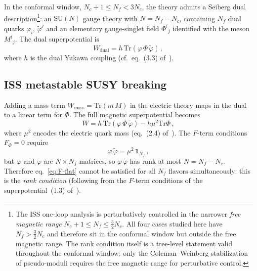 \documentclass[11pt,a4paper]{article}
\newcommand{\Nf}{N_{\!f}}
\newcommand{\Nc}{N_{\!c}}
\newcommand{\Tr}{\mathrm{Tr}}
\begin{document}
In the conformal window, $\Nc + 1 \le \Nf < 3\Nc$, the theory
admits a Seiberg dual description\footnote{The ISS one-loop
analysis is perturbatively controlled in the narrower
\emph{free magnetic range} $\Nc + 1 \le \Nf \le \frac{3}{2}\Nc$.
All four cases studied here have $\Nf > \frac{3}{2}\Nc$ and
therefore sit in the conformal window but outside the free
magnetic range.  The rank condition itself is a tree-level
statement valid throughout the conformal window; only the
Coleman--Weinberg stabilization of pseudo-moduli requires
the free magnetic range for perturbative control.}: an $\mathrm{SU}(N)$ gauge theory
with $N = \Nf - \Nc$, containing $\Nf$ dual quarks $\varphi_i$,
$\tilde\varphi^j$ and an elementary gauge-singlet field $\Phi^i{}_j$
identified with the meson $M^i{}_j$.
The dual superpotential is~\cite{Seiberg1995}
\begin{equation}
  W_{\text{dual}} = h\,\Tr(\varphi\,\Phi\,\tilde\varphi)\,,
  \label{eq:dual-W}
\end{equation}
where $h$ is the dual Yukawa coupling (cf.\ eq.~(3.3) of~\cite{Seiberg1995}).

\subsection{ISS metastable SUSY breaking}

Adding a mass term $W_{\text{mass}} = \Tr(m\, M)$ in the electric
theory maps in the dual to a linear term for $\Phi$.
The full magnetic superpotential becomes~\cite{ISS2006}
\begin{equation}
  W = h\,\Tr(\varphi\,\Phi\,\tilde\varphi)
    - h\mu^2 \Tr\Phi\,,
  \label{eq:ISS-W}
\end{equation}
where $\mu^2$ encodes the electric quark mass
(eq.~(2.4) of~\cite{ISS2006}).
The $F$-term conditions $F_\Phi = 0$ require
\begin{equation}
  \varphi\,\tilde\varphi = \mu^2\,\mathbf{1}_{\Nf}\,,
  \label{eq:F-flat}
\end{equation}
but $\varphi$ and $\tilde\varphi$ are $N\times\Nf$ matrices, so
$\varphi\,\tilde\varphi$ has rank at most $N = \Nf - \Nc$.
Therefore eq.~\eqref{eq:F-flat} cannot be satisfied for all $\Nf$
flavors simultaneously: this is the \emph{rank condition}
(following from the $F$-term conditions of the
superpotential~(1.3) of~\cite{ISS2006}).
\end{document}
